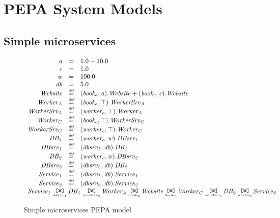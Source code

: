 %
%

\section{PEPA System Models}

%
%
\subsection{Simple microservices}

\begin{figure}
	\caption{Simple microservices PEPA model}
	\label{figure:simplemicro}
	\centering
	\begin{displaymath}
		\begin{array}{rcl}
			\mathit{a} & = & 1.0-10.0\\
			\mathit{c} & = & 1.0\\
			\mathit{w} & = & 100.0\\
			\mathit{db} & = & 5.0\\
			[0.0ex]		\mathit{Website} & \rmdef & (\mathit{book_a},\mathit{a}).\mathit{Website}+(\mathit{book_c},\mathit{c}).\mathit{Website}\\
			\mathit{Worker_A} & \rmdef & (\mathit{book_a},\top).\mathit{WorkerSrv_A}\\
			\mathit{WorkerSrv_A} & \rmdef & (\mathit{worker_a},\top).\mathit{Worker_A}\\
			\mathit{Worker_C} & \rmdef & (\mathit{book_c},\top).\mathit{WorkerSrv_C}\\
			\mathit{WorkerSrv_C} & \rmdef & (\mathit{worker_c},\top).\mathit{Worker_C}\\
			\mathit{DB_1} & \rmdef & (\mathit{worker_a},\mathit{w}).\mathit{DBsrv_1}\\
			\mathit{DBsrv_1} & \rmdef & (\mathit{dbsrv_1},\mathit{db}).\mathit{DB_1}\\
			\mathit{DB_2} & \rmdef & (\mathit{worker_c},\mathit{w}).\mathit{DBsrv_2}\\
			\mathit{DBsrv_2} & \rmdef & (\mathit{dbsrv_2},\mathit{db}).\mathit{DB_2}\\
			\mathit{Service_1} & \rmdef & (\mathit{dbsrv_1},\mathit{db}).\mathit{Service_1}\\
			\mathit{Service_2} & \rmdef & (\mathit{dbsrv_2},\mathit{db}).\mathit{Service_2}\\
			[0.0ex]		\multicolumn{3}{l}{\mathit{Service_1}\sync{dbsrv_1}\mathit{DB_1}\sync{worker_a}\mathit{Worker_A}\sync{book_a}\mathit{Website}\sync{book_c}\mathit{Worker_C}\sync{worker_c}\mathit{DB_2}\sync{dbsrv_2}\mathit{Service_2}}\\
			[0.0ex]	\end{array}
	\end{displaymath}
\end{figure}

